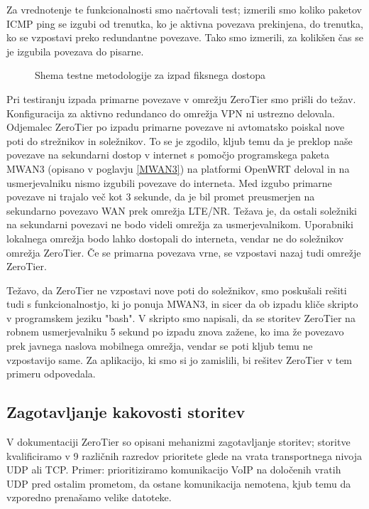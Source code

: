 \documentclass[a4paper, 12pt]{book}
\begin{document}
Za vrednotenje te funkcionalnosti smo načrtovali test; izmerili smo koliko paketov ICMP ping se izgubi od trenutka, ko je aktivna povezava prekinjena, do trenutka, ko se vzpostavi preko redundantne povezave. Tako smo izmerili, za kolikšen čas se je izgubila povezava do pisarne.


\begin{figure}[h]
\begin{center}

\end{center}
\caption{Shema testne metodologije za izpad fiksnega dostopa \cite{rvidmar}}
\label{izpad_dostopa}
\end{figure}

Pri testiranju izpada primarne povezave v omrežju ZeroTier smo prišli do težav. Konfiguracija za aktivno redundanco do omrežja VPN ni ustrezno delovala. Odjemalec ZeroTier po izpadu primarne povezave ni avtomatsko poiskal nove poti do strežnikov in soležnikov.
To se je zgodilo, kljub temu da je preklop naše povezave na sekundarni dostop v internet s pomočjo programskega paketa MWAN3 (opisano v poglavju \ref{MWAN3}) na platformi OpenWRT deloval in na usmerjevalniku nismo izgubili povezave do interneta. Med izgubo primarne povezave ni trajalo več kot 3 sekunde, da je bil promet preusmerjen na sekundarno povezavo WAN prek omrežja LTE/NR. Težava je, da ostali soležniki na sekundarni povezavi ne bodo videli omrežja za usmerjevalnikom. Uporabniki lokalnega omrežja bodo lahko dostopali do interneta, vendar ne do soležnikov omrežja ZeroTier. Če se primarna povezava vrne, se vzpostavi nazaj tudi omrežje ZeroTier.

Težavo, da ZeroTier ne vzpostavi nove poti do soležnikov, smo poskušali rešiti tudi s funkcionalnostjo, ki jo ponuja MWAN3, in sicer da ob izpadu kliče skripto v programskem jeziku "bash". V skripto smo napisali, da se storitev ZeroTier na robnem usmerjevalniku 5 sekund po izpadu znova zažene, ko ima že povezavo prek javnega naslova mobilnega omrežja, vendar se poti kljub temu ne vzpostavijo same. Za aplikacijo, ki smo si jo zamislili, bi rešitev ZeroTier v tem primeru odpovedala.

\subsection{Zagotavljanje kakovosti storitev}
V dokumentaciji ZeroTier \cite{noauthor_protocol_nodate} so opisani mehanizmi zagotavljanje storitev; storitve kvalificiramo v 9 različnih razredov prioritete glede na vrata transportnega nivoja UDP ali TCP. Primer: prioritiziramo komunikacijo VoIP na določenih vratih UDP pred ostalim prometom, da ostane komunikacija nemotena, kjub temu da vzporedno prenašamo velike datoteke.
\end{document}
